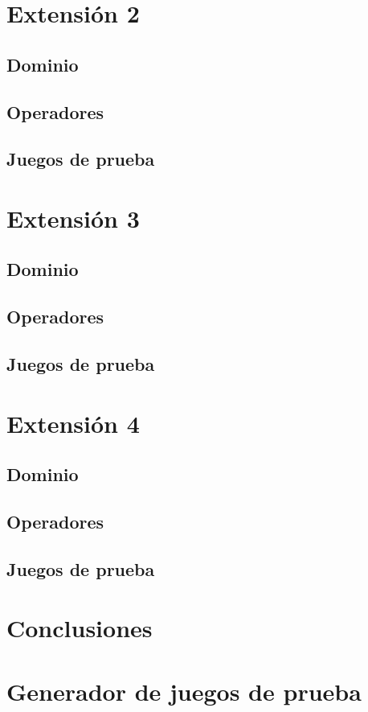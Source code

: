 \documentclass[12pt]{article}
\begin{document}
\section{Extensión 2}

\subsection{Dominio}

\subsection{Operadores}

\subsection{Juegos de prueba}


\section{Extensión 3}

\subsection{Dominio}

\subsection{Operadores}

\subsection{Juegos de prueba}


\section{Extensión 4}

\subsection{Dominio}

\subsection{Operadores}

\subsection{Juegos de prueba}


\section{Conclusiones}


\newpage
\appendix
\appendixpage
\addappheadtotoc

\section{Generador de juegos de prueba}
\end{document}
